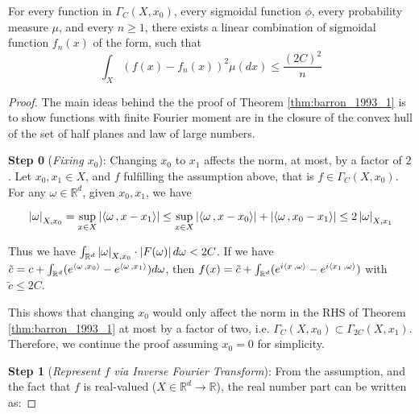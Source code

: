 \begin{theorem}\cite[Theorem~1]{barronUniversalApproximationBounds1993}\label{thm:barron_1993_1}
    For every function in $\Gamma_C(X, x_0)$, every sigmoidal function $\phi$,
    every probability measure $\mu$, and every $n \geq 1$, there exists a linear
    combination of sigmoidal function $f_n(x)$ of the form, such that
    \begin{equation}
        \int_X(f(x) - f_n(x))^2 \mu(dx) \leq \frac{(2C)^2}{n}
    \end{equation}
\end{theorem}


\begin{proof}

    The main ideas behind the the proof of Theorem \ref{thm:barron_1993_1} is to
    show functions with finite Fourier moment are in the closure of the convex
    hull of the set of half planes and law of large numbers.

    \textbf{Step 0} (\textit{Fixing $x_0$}): Changing $x_0$ to $x_1$ affects the
    norm, at most, by a factor of $2$. Let $x_0, x_1 \in X$, and $f$ fulfilling
    the assumption above, that is $f \in \Gamma_C(X, x_0)$. For any $\omega \in
        \mathbb{R}^d$, given $x_0, x_1$, we have

    \begin{equation}
        \left| \omega \right|_{X, x_0} = \sup_{x\in X}\left| \left\langle \omega\, , x-x_1 \right\rangle \right| \leq \sup_{x\in X}\left| \left\langle \omega\, , x-x_0 \right\rangle \right| + \left| \left\langle \omega\, , x_0-x_1 \right\rangle \right| \leq 2\left| \omega \right|_{X, x_1}
    \end{equation}

    Thus we have $\int_{\mathbb{R}^d} \left| \omega \right|_{X, x_0} \cdot
        \left| F(\omega) \right| d\omega < 2C$. If we have $\tilde{c} = c +
        \int_{\mathbb{R}^d} (e^{\left\langle \omega\, , x_0 \right\rangle} - e^{\left\langle \omega\, , x_1 \right\rangle})
        d\omega$, then $f(x) = \tilde{c} + \int_{\mathbb{R}^d} (e^{i\left\langle x\, , \omega \right\rangle}
        - e^{i\left\langle x_1\, , \omega \right\rangle})$ with $\tilde{c} \leq 2C$.

    This shows that changing $x_0$ would only affect the norm in the RHS of
    Theorem \ref{thm:barron_1993_1} at most by a factor of two, i.e.
    $\Gamma_C(X, x_0) \subset \Gamma_{2C}(X, x_1)$. Therefore, we continue the
    proof assuming $x_0 = 0$ for simplicity.

    \textbf{Step 1} (\textit{Represent $f$ via Inverse Fourier Transform}): From
    the assumption, and the fact that $f$ is real-valued ($X \in \mathbb{R}^d
        \to \mathbb{R}$), the real number part can be written as:


\end{proof}
